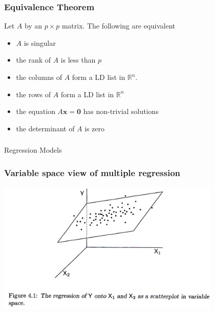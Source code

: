 \documentclass{beamer}
\newcommand{\RealN}{\ensuremath{\mathbb{R}^n}}
\newcommand{\Mtx}[1]{\ensuremath{\mathbf{#1}}}
\begin{document}
\begin{frame}
  \frametitle{Equivalence Theorem}
Let $A$ by an $p \times p$ matrix. The following are equivalent
\medskip

\begin{itemize}
	\item $A$ is singular
	\item the rank of $A$ is less than $p$
	\item the columns of $A$ form a LD list in \RealN.
	\item the rows of $A$ form a LD list in \RealN
	\item the equation $A\Mtx{x} = \Mtx{0}$ has non-trivial solutions
	\item the determinant of $A$ is zero 
\end{itemize}

\end{frame}


\begin{frame}
  \frametitle{}

\begin{center}
\begin{Huge}
Regression Models
\end{Huge}
\end{center}
\end{frame}

\begin{frame}[fragile]
  \frametitle{Variable space view of multiple regression}

\begin{center}
\includegraphics[height=2.5in]{regression-variable-space}
\end{center}  


\end{frame}
\end{document}

